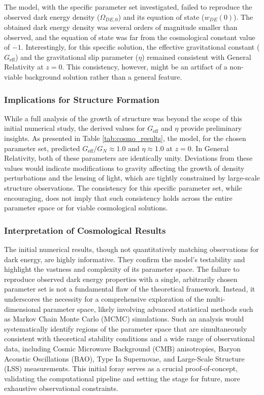 \documentclass[twocolumn]{aastex631}
\begin{document}
The model, with the specific parameter set investigated, failed to reproduce the observed dark energy density ($\Omega_{DE,0}$) and its equation of state ($w_{DE}(0)$). The obtained dark energy density was several orders of magnitude smaller than observed, and the equation of state was far from the cosmological constant value of $-1$. Interestingly, for this specific solution, the effective gravitational constant ($G_{\text{eff}}$) and the gravitational slip parameter ($\eta$) remained consistent with General Relativity at $z=0$. This consistency, however, might be an artifact of a non-viable background solution rather than a general feature.

\subsubsection{Implications for Structure Formation}
While a full analysis of the growth of structure was beyond the scope of this initial numerical study, the derived values for $G_{\text{eff}}$ and $\eta$ provide preliminary insights. As presented in Table \ref{tab:cosmo_results}, the model, for the chosen parameter set, predicted $G_{\text{eff}}/G_N \approx 1.0$ and $\eta \approx 1.0$ at $z=0$. In General Relativity, both of these parameters are identically unity. Deviations from these values would indicate modifications to gravity affecting the growth of density perturbations and the lensing of light, which are tightly constrained by large-scale structure observations. The consistency for this specific parameter set, while encouraging, does not imply that such consistency holds across the entire parameter space or for viable cosmological solutions.

\subsubsection{Interpretation of Cosmological Results}
The initial numerical results, though not quantitatively matching observations for dark energy, are highly informative. They confirm the model's testability and highlight the vastness and complexity of its parameter space. The failure to reproduce observed dark energy properties with a single, arbitrarily chosen parameter set is not a fundamental flaw of the theoretical framework. Instead, it underscores the necessity for a comprehensive exploration of the multi-dimensional parameter space, likely involving advanced statistical methods such as Markov Chain Monte Carlo (MCMC) simulations. Such an analysis would systematically identify regions of the parameter space that are simultaneously consistent with theoretical stability conditions and a wide range of observational data, including Cosmic Microwave Background (CMB) anisotropies, Baryon Acoustic Oscillations (BAO), Type Ia Supernovae, and Large-Scale Structure (LSS) measurements. This initial foray serves as a crucial proof-of-concept, validating the computational pipeline and setting the stage for future, more exhaustive observational constraints.
\end{document}
